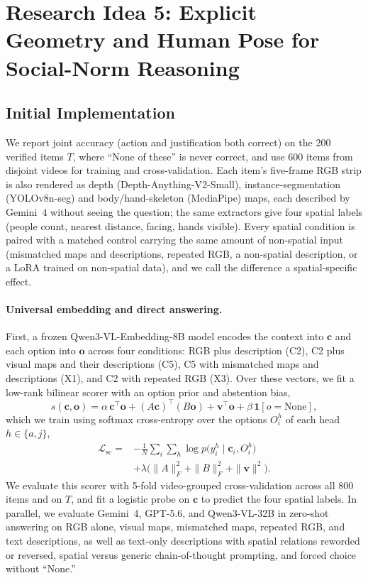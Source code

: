 \section{Research Idea 5: Explicit Geometry and Human Pose for Social-Norm Reasoning}
\subsection{Initial Implementation}
\label{sec:idea5-impl}

We report joint accuracy (action and justification both correct) on the 200 verified items $T$, where ``None of these'' is never correct, and use 600 items from disjoint videos for training and cross-validation. Each item's five-frame RGB strip is also rendered as depth (Depth-Anything-V2-Small), instance-segmentation (YOLOv8n-seg) and body/hand-skeleton (MediaPipe) maps, each described by Gemini~4 without seeing the question; the same extractors give four spatial labels (people count, nearest distance, facing, hands visible). Every spatial condition is paired with a matched control carrying the same amount of non-spatial input (mismatched maps and descriptions, repeated RGB, a non-spatial description, or a LoRA trained on non-spatial data), and we call the difference a spatial-specific effect.

\paragraph{Universal embedding and direct answering.}
First, a frozen Qwen3-VL-Embedding-8B model encodes the context into $\mathbf c$ and each option into $\mathbf o$ across four conditions: RGB plus description (C2), C2 plus visual maps and their descriptions (C5), C5 with mismatched maps and descriptions (X1), and C2 with repeated RGB (X3). Over these vectors, we fit a low-rank bilinear scorer with an option prior and abstention bias,
\begin{equation}
s(\mathbf c,\mathbf o)=\alpha\,\mathbf c^{\top}\mathbf o+(A\mathbf c)^{\top}(B\mathbf o)+\mathbf v^{\top}\mathbf o+\beta\,\mathbf 1[o=\text{None}],
\end{equation}
which we train using softmax cross-entropy over the options $O^{h}_i$ of each head $h\in\{a,j\}$,
\begin{equation}
\begin{split}
\mathcal L_{\mathrm{sc}}={}&-\tfrac1N\textstyle\sum_{i}\sum_{h}\log p\big(y^{h}_i\mid\mathbf c_i,O^{h}_i\big)\\
&+\lambda\big(\|A\|_F^2+\|B\|_F^2+\|\mathbf v\|^2\big).
\end{split}
\end{equation}
We evaluate this scorer with 5-fold video-grouped cross-validation across all 800 items and on $T$, and fit a logistic probe on $\mathbf c$ to predict the four spatial labels. In parallel, we evaluate Gemini~4, GPT-5.6, and Qwen3-VL-32B in zero-shot answering on RGB alone, visual maps, mismatched maps, repeated RGB, and text descriptions, as well as text-only descriptions with spatial relations reworded or reversed, spatial versus generic chain-of-thought prompting, and forced choice without ``None.''

